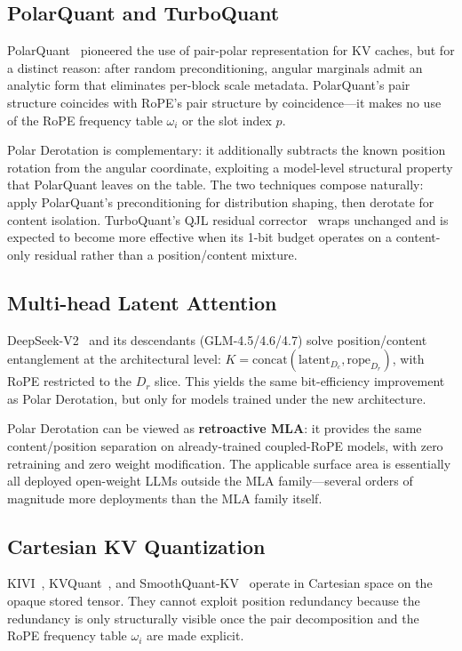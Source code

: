 \documentclass[10pt,twocolumn]{article}
\begin{document}
\subsection{PolarQuant and TurboQuant}

PolarQuant~\cite{polarquant2025} pioneered the use of pair-polar representation for KV caches, but for a distinct reason: after random preconditioning, angular marginals admit an analytic form that eliminates per-block scale metadata. PolarQuant's pair structure coincides with RoPE's pair structure by coincidence---it makes no use of the RoPE frequency table $\omega_i$ or the slot index $p$.

Polar Derotation is complementary: it additionally subtracts the known position rotation from the angular coordinate, exploiting a model-level structural property that PolarQuant leaves on the table. The two techniques compose naturally: apply PolarQuant's preconditioning for distribution shaping, then derotate for content isolation. TurboQuant's QJL residual corrector~\cite{turboquant2026} wraps unchanged and is expected to become more effective when its 1-bit budget operates on a content-only residual rather than a position/content mixture.

\subsection{Multi-head Latent Attention}

DeepSeek-V2~\cite{deepseekv2} and its descendants (GLM-4.5/4.6/4.7) solve position/content entanglement at the architectural level: $K = \text{concat}(\text{latent}_{D_c},\text{rope}_{D_r})$, with RoPE restricted to the $D_r$ slice. This yields the same bit-efficiency improvement as Polar Derotation, but only for models trained under the new architecture.

Polar Derotation can be viewed as \textbf{retroactive MLA}: it provides the same content/position separation on already-trained coupled-RoPE models, with zero retraining and zero weight modification. The applicable surface area is essentially all deployed open-weight LLMs outside the MLA family---several orders of magnitude more deployments than the MLA family itself.

\subsection{Cartesian KV Quantization}

KIVI~\cite{kivi2024}, KVQuant~\cite{kvquant2024}, and SmoothQuant-KV~\cite{smoothquant2023} operate in Cartesian space on the opaque stored tensor. They cannot exploit position redundancy because the redundancy is only structurally visible once the pair decomposition and the RoPE frequency table $\omega_i$ are made explicit.
\end{document}
